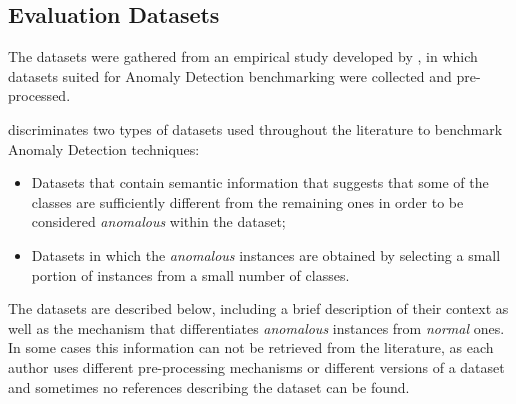 \subsection{Evaluation Datasets}\label{sec:datasets}

The datasets were gathered from an empirical study developed by \textcite{Campos2016}, in which datasets suited for Anomaly Detection benchmarking were collected and pre-processed.

\textcite{Campos2016} discriminates two types of datasets used throughout the literature to benchmark Anomaly Detection techniques:

\begin{itemize}
	\item Datasets that contain semantic information that suggests that some of the classes are sufficiently different from the remaining ones in order to be considered \textit{anomalous} within the dataset;
	
	\item Datasets in which the \textit{anomalous} instances are obtained by selecting a small portion of instances from a small number of classes.
\end{itemize}

The datasets are described below, including a brief description of their context as well as the mechanism that differentiates \textit{anomalous} instances from \textit{normal} ones.
In some cases this information can not be retrieved from the literature, as each author uses different pre-processing mechanisms or different versions of a dataset and sometimes no references describing the dataset can be found.

